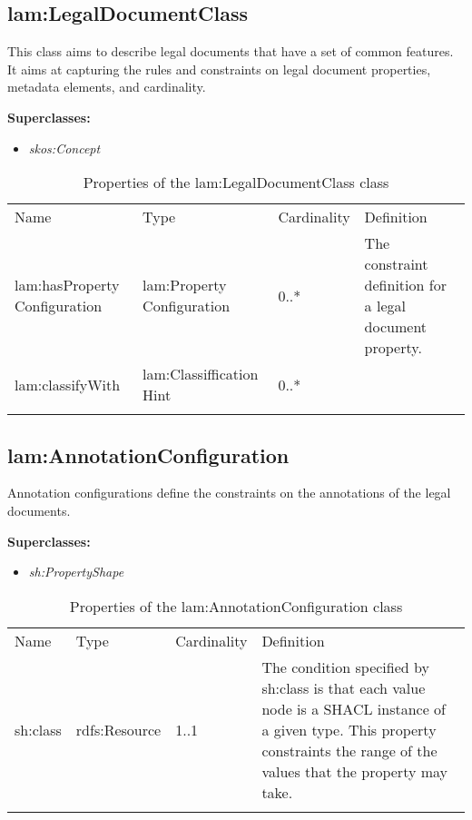\subsection{lam:LegalDocumentClass}

This class aims to describe legal documents that have a set of common features. It aims at capturing the rules and constraints on legal document properties, metadata elements, and cardinality.

\textbf{Superclasses:}

\begin{itemize}
\itemsep1pt\parskip0pt
\item
  \emph{skos:Concept}
\end{itemize}

{
	\footnotesize
	\selectfont%
	\begin{longtable}[c]{@{}p{3cm}p{3cm}p{2cm}p{5.8cm}@{}}
		\toprule\addlinespace
		Name & Type & Cardinality & Definition
		\\\addlinespace
		\midrule\endhead
		lam:hasProperty​Configuration​ & lam:Property​Configuration​ & 0..*​ &
		The constraint definition for a legal document property. ​
		\\\addlinespace
		lam:classify​With​ & lam:Classiffication​Hint​ & 0..*​ &
		\\\addlinespace
		\bottomrule
		\addlinespace
		\caption{Properties of the lam:LegalDocumentClass class}
	\end{longtable}
}

\subsection{lam:AnnotationConfiguration}

Annotation configurations define the constraints on the annotations of
the legal documents.

\textbf{Superclasses:}

\begin{itemize}
\itemsep1pt\parskip0pt
\item
  \emph{sh:PropertyShape}
\end{itemize}

{
	\footnotesize
	\selectfont%
	\begin{longtable}[c]{@{}p{3cm}p{2cm}p{2cm}p{7.8cm}@{}}
		\toprule\addlinespace
		Name & Type & Cardinality & Definition
		\\\addlinespace
		\midrule\endhead
		sh:class & rdfs:Resource & 1..1 & The condition specified by sh:class is
		that each value node is a SHACL instance of a given type. This property
		constraints the range of the values that the property may take.
		\\\addlinespace
		\bottomrule
		\addlinespace
		\caption{Properties of the lam:AnnotationConfiguration class}
	\end{longtable}
}

